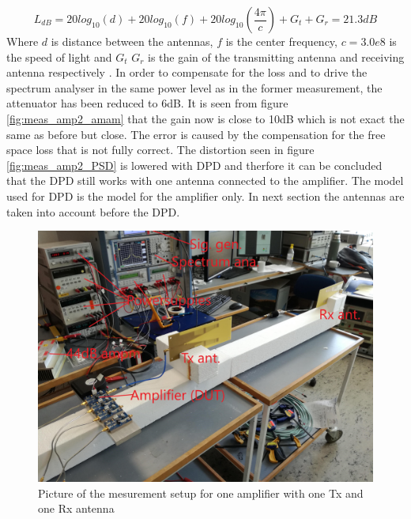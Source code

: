 \begin{equation}
 L_{dB} = 20log_{10}(d)+20log_{10}(f)+20log_{10}(\frac{4\pi}{c})+G_t+G_r = 21.3dB
\end{equation}
Where $d$ is distance between the antennas, $f$ is the center frequency, $c=3.0e8$ is the speed of light and $G_t$ $G_r$ is the gain of the transmitting antenna and receiving antenna respectively \citep{Balanis2005}. In order to compensate for the loss and to drive the spectrum analyser in the same power level as in the former measurement, the attenuator has been reduced to 6dB. It is seen from figure \ref{fig:meas_amp2_amam} that the gain now is close to 10dB which is not exact the same as before but close. The error is caused by the compensation for the free space loss that is not fully correct. The distortion seen in figure \ref{fig:meas_amp2_PSD} is lowered with DPD and therfore it can be concluded that the DPD still works with one antenna connected to the amplifier. The model used for DPD is the model for the amplifier only. In next section the antennas are taken into account before the DPD.      


\begin{figure}[H]
\centering 
\includegraphics[scale = 0.08]{figures/measurement/cree/meas2/meas2.jpg}
\caption{Picture of the mesurement setup for one amplifier with one Tx and one Rx antenna }
\label{fig:meas_amp2_pic}
\end{figure}



